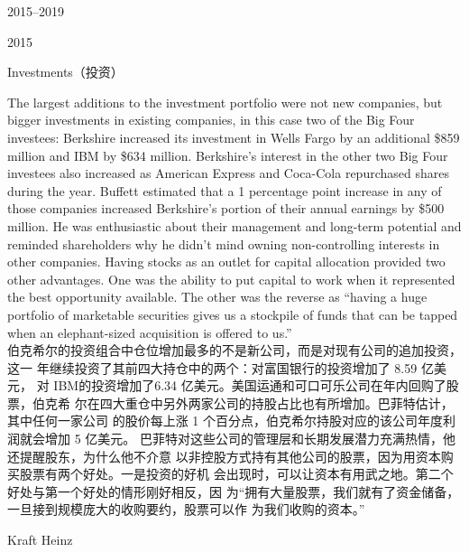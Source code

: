 \begin{chapter}{2015--2019}
\begin{section}{2015}
\begin{subsection}{Investments（投资）}
\begin{verseparallel}
  {
    The largest additions to the investment portfolio were not new companies,
    but bigger investments in existing companies, in this case two of the Big
    Four investees: Berkshire increased its investment in Wells Fargo by an
    additional \$859 million and IBM by \$634 million. Berkshire’s interest in
    the other two Big Four investees also increased as American Express and
    Coca-Cola repurchased shares during the year. Buffett estimated that a 1
    percentage point increase in any of those companies increased Berkshire’s
    portion of their annual earnings by \$500 million. He was enthusiastic about
    their management and long-term potential and reminded shareholders why he
    didn’t mind owning non-controlling interests in other companies. Having
    stocks as an outlet for capital allocation provided two other advantages.
    One was the ability to put capital to work when it represented the best
    opportunity available. The other was the reverse as ``having a huge
    portfolio of marketable securities gives us a stockpile of funds that can be
    tapped when an elephant-sized acquisition is offered to us.'' \\
  }
  {
    伯克希尔的投资组合中仓位增加最多的不是新公司，而是对现有公司的追加投资，这一
    年继续投资了其前四大持仓中的两个：对富国银行的投资增加了 8.59 亿美元，
    对 IBM的投资增加了6.34 亿美元。美国运通和可口可乐公司在年内回购了股票，伯克希
    尔在四大重仓中另外两家公司的持股占比也有所增加。巴菲特估计，其中任何一家公司
    的股价每上涨 1 个百分点，伯克希尔持股对应的该公司年度利润就会增加 5 亿美元。
    巴菲特对这些公司的管理层和长期发展潜力充满热情，他还提醒股东，为什么他不介意
    以非控股方式持有其他公司的股票，因为用资本购买股票有两个好处。一是投资的好机
    会出现时，可以让资本有用武之地。第二个好处与第一个好处的情形刚好相反，因
    为“拥有大量股票，我们就有了资金储备，一旦接到规模庞大的收购要约，股票可以作
    为我们收购的资本。”
  }
\end{verseparallel}
\end{subsection}

\begin{subsection}{Kraft Heinz}


\end{subsection}
\end{section}
\end{chapter}
